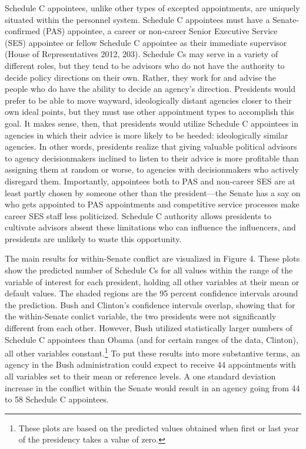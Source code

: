 \documentclass[12pt]{article}
\begin{document}
Schedule C appointees, unlike other types of excepted appointments, are uniquely situated within the personnel system. Schedule C appointees must have a Senate-confirmed (PAS) appointee, a career or non-career Senior Executive Service (SES) appointee or fellow Schedule C appointee as their immediate supervisor (House of Representatives 2012, 203). Schedule Cs may serve in a variety of different roles, but they tend to be advisors who do not have the authority to decide policy directions on their own. Rather, they work for and advise the people who do have the ability to decide an agency's direction. Presidents would prefer to be able to move wayward, ideologically distant agencies closer to their own ideal points, but they must use other appointment types to accomplish this goal. It makes sense, then, that presidents would utilize Schedule C appointees in agencies in which their advice is more likely to be heeded: ideologically similar agencies. In other words, presidents realize that giving valuable political advisors to agency decisionmakers inclined to listen to their advice is more profitable than assigning them at random or worse, to agencies with decisionmakers who actively disregard them. Importantly, appointees both to PAS and non-career SES are at least partly chosen by someone other than the president---the Senate has a say on who gets appointed to PAS appointments and competitive service processes make career SES staff less politicized. Schedule C authority allows presidents to cultivate advisors absent these limitations who can influence the influencers, and presidents are unlikely to waste this opportunity.

The main results for within-Senate conflict are visualized in Figure 4. These plots show the predicted number of Schedule Cs for all values within the range of the variable of interest for each president, holding all other variables at their mean or default values. The shaded regions are the 95 percent confidence intervals around the prediction. Bush and Clinton's confidence intervals overlap, showing that for the within-Senate conlict variable, the two presidents were not significantly different from each other. However, Bush utilized statistically larger numbers of Schedule C appointees than Obama (and for certain ranges of the data, Clinton), all other variables constant.\footnote{These plots are based on the predicted values obtained when first or last year of the presidency takes a value of zero.} To put these results into more substantive terms, an agency in the Bush administration could expect to receive 44 appointments with all variables set to their mean or reference levels. A one standard deviation increase in the conflict within the Senate would result in an agency going from 44 to 58 Schedule C appointees.
\end{document}
